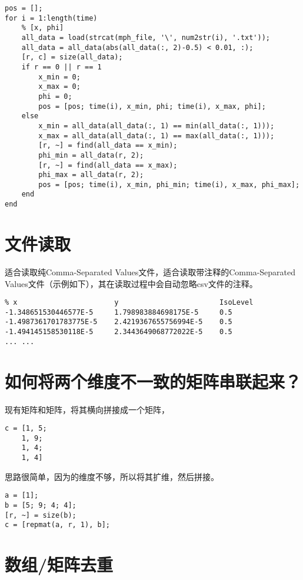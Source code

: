\begin{verbatim}
pos = [];
for i = 1:length(time)
    % [x, phi]
    all_data = load(strcat(mph_file, '\', num2str(i), '.txt'));
    all_data = all_data(abs(all_data(:, 2)-0.5) < 0.01, :);
    [r, c] = size(all_data);
    if r == 0 || r == 1
        x_min = 0;
        x_max = 0;
        phi = 0;
        pos = [pos; time(i), x_min, phi; time(i), x_max, phi];
    else
        x_min = all_data(all_data(:, 1) == min(all_data(:, 1)));
        x_max = all_data(all_data(:, 1) == max(all_data(:, 1)));
        [r, ~] = find(all_data == x_min);
        phi_min = all_data(r, 2);
        [r, ~] = find(all_data == x_max);
        phi_max = all_data(r, 2);
        pos = [pos; time(i), x_min, phi_min; time(i), x_max, phi_max];
    end
end
\end{verbatim}

\section{文件读取}

适合读取纯Comma-Separated Values文件，适合读取带注释的Comma-Separated Values文件（示例如下），其在读取过程中会自动忽略csv文件的注释。

\begin{verbatim}
% x                       y                        IsoLevel
-1.348651530446577E-5     1.798983884698175E-5     0.5
-1.4987361701783775E-5    2.4219367655756994E-5    0.5
-1.494145158530118E-5     2.3443649068772022E-5    0.5
... ...
\end{verbatim}

\section{如何将两个维度不一致的矩阵串联起来？}

现有矩阵和矩阵，将其横向拼接成一个矩阵，

\begin{verbatim}
c = [1, 5;
    1, 9;
    1, 4;
    1, 4]
\end{verbatim}

思路很简单，因为的维度不够，所以将其扩维，然后拼接。

\begin{verbatim}
a = [1];
b = [5; 9; 4; 4];
[r, ~] = size(b);
c = [repmat(a, r, 1), b];
\end{verbatim}

\section{数组/矩阵去重}

